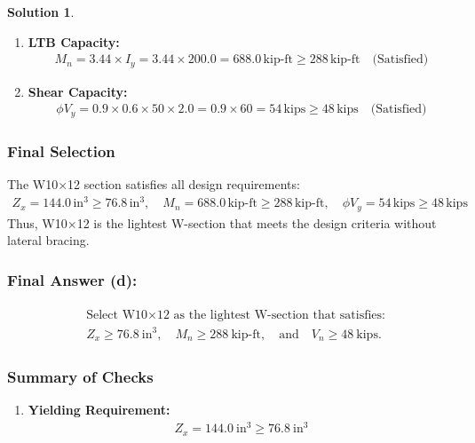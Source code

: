 \documentclass[12pt]{article}
\theoremstyle{definition} %
\newtheorem{solution}{Solution}
\theoremstyle{plain} %
\begin{document}
\begin{solution}
\begin{enumerate}
\begin{enumerate}
    \item \textbf{LTB Capacity:}
    \begin{align}
    M_n = 3.44 \times I_y = 3.44 \times 200.0 = 688.0 \, \text{kip-ft} \geq 288 \, \text{kip-ft} \quad \text{(Satisfied)}
    \end{align}
    
    \item \textbf{Shear Capacity:}
    \begin{align}
    \phi V_y = 0.9 \times 0.6 \times 50 \times 2.0 = 0.9 \times 60 = 54 \, \text{kips} \geq 48 \, \text{kips} \quad \text{(Satisfied)}
    \end{align}
\end{enumerate}

\subsubsection*{Final Selection}
The W10$\times$12 section satisfies all design requirements:
\begin{align}
Z_x = 144.0 \, \text{in}^3 \geq 76.8 \, \text{in}^3, \quad M_n = 688.0 \, \text{kip-ft} \geq 288 \, \text{kip-ft}, \quad \phi V_y = 54 \, \text{kips} \geq 48 \, \text{kips}
\end{align}
Thus, W10$\times$12 is the lightest W-section that meets the design criteria without lateral bracing.

\subsubsection*{Final Answer (d):}
\begin{align}
\boxed{
\begin{aligned}
    &\text{Select W10$\times$12 as the lightest W-section that satisfies:} \\
    &Z_x \geq 76.8~\text{in}^3, \quad M_n \geq 288~\text{kip-ft}, \quad \text{and} \quad V_n \geq 48~\text{kips}.
\end{aligned}
}
\end{align}

\subsubsection*{Summary of Checks}
\begin{enumerate}
    \item \textbf{Yielding Requirement:}
    \begin{align}
    Z_x = 144.0~\text{in}^3 \geq 76.8~\text{in}^3
    \end{align}
    

\end{enumerate}
\end{enumerate}
\end{solution}
\end{document}
